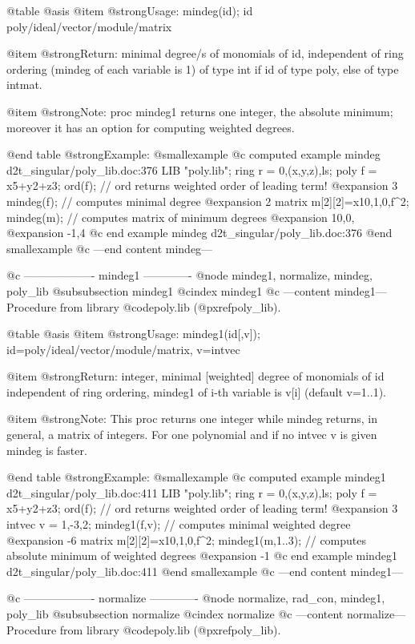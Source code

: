 @table @asis
@item @strong{Usage:}
mindeg(id); id poly/ideal/vector/module/matrix

@item @strong{Return:}
minimal degree/s of monomials of id, independent of ring ordering
(mindeg of each variable is 1) of type int if id of type poly, else
of type intmat.

@item @strong{Note:}
proc mindeg1 returns one integer, the absolute minimum; moreover it
has an option for computing weighted degrees.

@end table
@strong{Example:}
@smallexample
@c computed example mindeg d2t_singular/poly_lib.doc:376 
LIB "poly.lib";
ring r = 0,(x,y,z),ls;
poly f = x5+y2+z3;
ord(f);                  // ord returns weighted order of leading term!
@expansion{} 3
mindeg(f);               // computes minimal degree
@expansion{} 2
matrix m[2][2]=x10,1,0,f^2;
mindeg(m);               // computes matrix of minimum degrees
@expansion{} 10,0,
@expansion{} -1,4 
@c end example mindeg d2t_singular/poly_lib.doc:376
@end smallexample
@c ---end content mindeg---

@c ------------------- mindeg1 -------------
@node mindeg1, normalize, mindeg, poly_lib
@subsubsection mindeg1
@cindex mindeg1
@c ---content mindeg1---
Procedure from library @code{poly.lib} (@pxref{poly_lib}).

@table @asis
@item @strong{Usage:}
mindeg1(id[,v]); id=poly/ideal/vector/module/matrix, v=intvec

@item @strong{Return:}
integer, minimal [weighted] degree of monomials of id independent of
ring ordering, mindeg1 of i-th variable is v[i] (default v=1..1).

@item @strong{Note:}
This proc returns one integer while mindeg returns, in general,
a matrix of integers. For one polynomial and if no intvec v is given
mindeg is faster.

@end table
@strong{Example:}
@smallexample
@c computed example mindeg1 d2t_singular/poly_lib.doc:411 
LIB "poly.lib";
ring r = 0,(x,y,z),ls;
poly f = x5+y2+z3;
ord(f);                  // ord returns weighted order of leading term!
@expansion{} 3
intvec v = 1,-3,2;
mindeg1(f,v);            // computes minimal weighted degree
@expansion{} -6
matrix m[2][2]=x10,1,0,f^2;
mindeg1(m,1..3);         // computes absolute minimum of weighted degrees
@expansion{} -1
@c end example mindeg1 d2t_singular/poly_lib.doc:411
@end smallexample
@c ---end content mindeg1---

@c ------------------- normalize -------------
@node normalize, rad_con, mindeg1, poly_lib
@subsubsection normalize
@cindex normalize
@c ---content normalize---
Procedure from library @code{poly.lib} (@pxref{poly_lib}).

